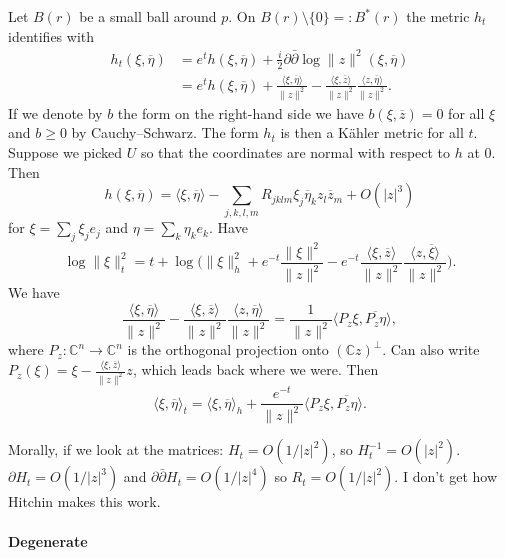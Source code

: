 \documentclass[10pt,a4paper]{amsart}
\newcommand{\kk}[1]{\mathbb{#1}}
\def\<{\langle}
\def\>{\rangle}
\def\ov#1{\overline{#1}}
\begin{document}
Let $B(r)$ be a small ball around $p$.
On $B(r) \setminus \{0\} =: B^*(r)$
the metric $h_t$ identifies with
\begin{align*}
h_t(\xi, \ov\eta)
&= e^t h(\xi, \ov\eta) + \tfrac i2 \partial \bar\partial \log \|z\|^2(\xi, \ov\eta)
\\
&= e^t h(\xi, \ov\eta)
+ \frac{\<\xi, \ov\eta\>}{\|z\|^2}
- \frac{\<\xi, \ov z\>}{\|z\|^2}
\frac{\<z, \ov\eta\>}{\|z\|^2}.
\end{align*}
If we denote by $b$ the form on the right-hand side we have $b(\xi, \ov z) = 0$
for all $\xi$ and $b \geq 0$ by Cauchy--Schwarz.
The form $h_t$ is then a K\"ahler metric for all $t$.
Suppose we picked $U$ so that the coordinates are normal with respect to $h$ at
$0$.
Then
$$
h(\xi,\ov\eta)
= \<\xi, \ov\eta\>
- \sum_{j,k,l,m} R_{jklm} \xi_j \ov{\eta}_k z_l \ov z_m
+ O(|z|^3)
$$
for $\xi = \sum_j \xi_j e_j$ and $\eta = \sum_k \eta_k e_k$.
Have
$$
\log \|\xi\|^2_t
= t + \log\biggl(
\|\xi\|^2_h
+ e^{-t} \frac{\|\xi\|^2}{\|z\|^2}
- e^{-t} \frac{\<\xi, \ov z\>}{\|z\|^2}
\frac{\<z, \ov\xi\>}{\|z\|^2}
\biggr).
$$
We have
$$
\frac{\<\xi, \ov\eta\>}{\|z\|^2}
- \frac{\<\xi, \ov z\>}{\|z\|^2}
\frac{\<z, \ov \eta\>}{\|z\|^2}
= \frac{1}{\|z\|^2} \< P_z\xi, \ov{P_z\eta} \>,
$$
where $P_z : \kk C^n \to \kk C^n$ is the orthogonal projection onto $(\kk
C z)^\perp$.
Can also write $P_z(\xi) = \xi - \frac{\<\xi, \ov z\>}{\|z\|^2} z$,
which leads back where we were.
Then
$$
\<\xi, \ov\eta\>_t
= \<\xi, \ov\eta\>_h
+ \frac{e^{-t}}{\|z\|^2} \< P_z \xi, \ov{P_z \eta} \>.
$$

Morally, if we look at the matrices:
$H_t = O(1/|z|^2)$, so $H_t^{-1} = O(|z|^2)$.
$\partial H_t = O(1/|z|^3)$ and $\partial\bar\partial H_t = O(1/|z|^4)$
so $R_t=O(1/|z|^2)$.
I don't get how Hitchin makes this work.


\paragraph{Degenerate}
\end{document}
